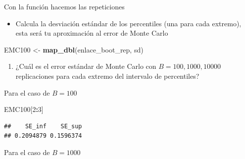 \documentclass[]{article}
\newenvironment{Shaded}{\begin{snugshade}}{\end{snugshade}}
\newcommand{\DataTypeTok}[1]{\textcolor[rgb]{0.13,0.29,0.53}{#1}}
\newcommand{\DecValTok}[1]{\textcolor[rgb]{0.00,0.00,0.81}{#1}}
\newcommand{\KeywordTok}[1]{\textcolor[rgb]{0.13,0.29,0.53}{\textbf{#1}}}
\newcommand{\NormalTok}[1]{#1}
\newcommand{\OperatorTok}[1]{\textcolor[rgb]{0.81,0.36,0.00}{\textbf{#1}}}
\newcommand{\StringTok}[1]{\textcolor[rgb]{0.31,0.60,0.02}{#1}}
\providecommand{\tightlist}{%
  \setlength{\itemsep}{0pt}\setlength{\parskip}{0pt}}
\begin{document}
Con la función hacemos las repeticiones

\begin{Shaded}
\end{Shaded}

\begin{itemize}
\tightlist
\item
  Calcula la desviación estándar de los percentiles (una para cada
  extremo), esta será tu aproximación al error de Monte Carlo
\end{itemize}

\begin{Shaded}
\begin{Highlighting}[]
\NormalTok{EMC100 <-}\StringTok{ }\KeywordTok{map_dbl}\NormalTok{(enlace_boot_rep, sd)}
\end{Highlighting}
\end{Shaded}

\begin{enumerate}
\def\labelenumi{\arabic{enumi}.}
\setcounter{enumi}{2}
\tightlist
\item
  ¿Cuál es el error estándar de Monte Carlo con \(B = 100, 1000, 10000\)
  replicaciones para cada extremo del intervalo de percentiles?
\end{enumerate}

Para el caso de \(B = 100\)

\begin{Shaded}
\begin{Highlighting}[]
\NormalTok{EMC100[}\DecValTok{2}\OperatorTok{:}\DecValTok{3}\NormalTok{]}
\end{Highlighting}
\end{Shaded}

\begin{verbatim}
##    SE_inf    SE_sup 
## 0.2094879 0.1596374
\end{verbatim}

Para el caso de \(B = 1000\)

\begin{Shaded}
\end{Shaded}
\end{document}

